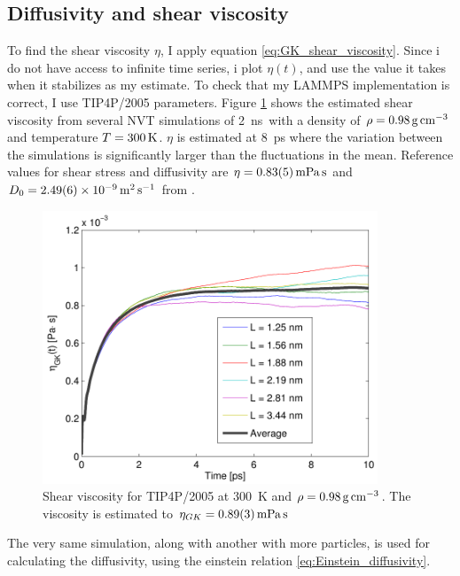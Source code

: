 \subsection{Diffusivity and shear viscosity}
To find the shear viscosity $\eta$, I apply equation \ref{eq:GK_shear_viscosity}. Since i do not have access to infinite time series, i plot $\eta(t)$, and use the value it takes when it stabilizes as my estimate. To check that my LAMMPS implementation is correct, I use TIP4P/2005 parameters.  Figure \ref{fig:shear_viscosity_tip4p/2005} shows the estimated shear viscosity from several NVT simulations of \SI{2}{\nano\second} with a density of $\rho = \text{\SI{0.98}{\gram\per\cubic\cm}}$ and temperature $T=\text{\SI{300}{\kelvin}}$. $\eta$ is estimated at \SI{8}{\pico\second} where the variation between the simulations is significantly larger than the fluctuations in the mean. Reference values for shear stress and diffusivity are $\eta = \text{\SI{0.83 \pm 0.05}{\milli\pascal\second}}$ and $D_0 = \text{\SI{2.49 \pm 0.06d-9}{\metre\squared\per\second}}$ from \cite{tazi2012}.

\begin{figure}
\centering
\includegraphics[width=10cm]{../figures/thesis/viscosity_green_kubo_tip4p_2005.pdf}
\caption{Shear viscosity for TIP4P/2005 at \SI{300}{\kelvin} and $\rho = \text{\SI{0.98}{\gram\per\cubic\cm}}$. The viscosity is estimated to $\eta_{GK} = \text{\SI{0.89\pm0.03}{\milli\pascal\second}}$}
\label{fig:shear_viscosity_tip4p/2005}
\end{figure}

The very same simulation, along with another with more particles, is used for calculating the diffusivity, using the einstein relation \ref{eq:Einstein_diffusivity}. 

